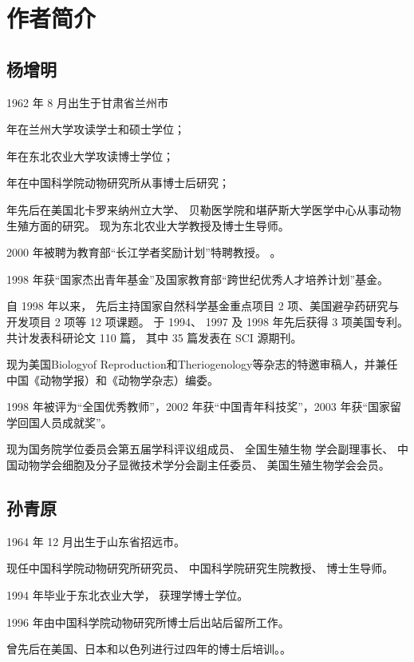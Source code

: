 \chapter{作者简介}

\section{杨增明} 

1962 年 8 月出生于甘肃省兰州市

 年在兰州大学攻读学士和硕士学位；

年在东北农业大学攻读博士学位；

年在中国科学院动物研究所从事博士后研究；

年先后在美国北卡罗来纳州立大学、 贝勒医学院和堪萨斯大学医学中心从事动物生殖方面的研究。 现为东北农业大学教授及博士生导师。

2000 年被聘为教育部“长江学者奖励计划”特聘教授。 。

1998 年获“国家杰出青年基金”及国家教育部“跨世纪优秀人才培养计划”基金。 

自 1998 年以来， 先后主持国家自然科学基金重点项目 2 项、美国避孕药研究与开发项目 2 项等 12 项课题。 于 1994、 1997 及 1998 年先后获得 3 项美国专利。 共计发表科研论文 110 篇， 其中 35 篇发表在 SCI 源期刊。

现为美国Biologyof Reproduction和Theriogenology等杂志的特邀审稿人，并兼任中国《动物学报）和《动物学杂志）编委。 

1998 年被评为“全国优秀教师”，2002 年获“中国青年科技奖”，2003 年获“国家留学回国人员成就奖”。

现为国务院学位委员会第五届学科评议组成员、 全国生殖生物 学会副理事长、 中国动物学会细胞及分子显微技术学分会副主任委员、 美国生殖生物学会会员。

\section{孙青原} 

1964 年 12 月出生于山东省招远市。 

现任中国科学院动物研究所研究员、 中国科学院研究生院教授、 博士生导师。

1994 年毕业于东北衣业大学， 获理学博士学位。 

1996 年由中国科学院动物研究所博士后出站后留所工作。 

曾先后在美国、日本和以色列进行过四年的博士后培训。。

